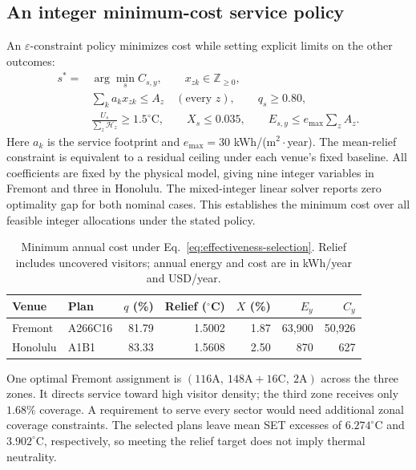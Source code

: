 \subsection{An integer minimum-cost service policy}
An $\varepsilon$-constraint policy minimizes cost while setting explicit limits on the other outcomes:
\begin{equation}
 \begin{aligned}
 s^*={}&\arg\min_s C_{s,y},\qquad x_{zk}\in\mathbb Z_{\ge0},\\
 &\sum_k a_kx_{zk}\le A_z\quad(\text{every }z),\qquad q_s\ge0.80,\\
 &\frac{U_s}{\sum_z\mathcal H_z}\ge1.5^\circ\mathrm C,\qquad
 X_s\le0.035,\qquad E_{s,y}\le e_{\max}\sum_z A_z .
 \end{aligned}
\label{eq:effectiveness-selection}
\end{equation}
Here $a_k$ is the service footprint and $e_{\max}=30$ kWh/(m$^2\!\cdot$year). The mean-relief constraint is equivalent to a residual ceiling under each venue's fixed baseline. All coefficients are fixed by the physical model, giving nine integer variables in Fremont and three in Honolulu. The mixed-integer linear solver reports zero optimality gap for both nominal cases. This establishes the minimum cost over all feasible integer allocations under the stated policy.

\begin{table}[!ht]
\centering\small
\caption{Minimum annual cost under Eq.~\eqref{eq:effectiveness-selection}. Relief includes uncovered visitors; annual energy and cost are in kWh/year and USD/year.}
\label{tab:venue-decisions}
\begin{tabular}{@{}llrrrrr@{}}
\toprule
Venue & Plan & $q$ (\%) & Relief ($^\circ$C) & $X$ (\%) & $E_y$ & $C_y$\\
\midrule
Fremont & A266C16 & 81.79 & 1.5002 & 1.87 & 63,900 & 50,926\\
Honolulu & A1B1 & 83.33 & 1.5608 & 2.50 & 870 & 627\\
\bottomrule
\end{tabular}
\end{table}

One optimal Fremont assignment is $(116\mathrm A,\ 148\mathrm A+16\mathrm C,\ 2\mathrm A)$ across the three zones. It directs service toward high visitor density; the third zone receives only $1.68\%$ coverage. A requirement to serve every sector would need additional zonal coverage constraints. The selected plans leave mean SET excesses of $6.274^\circ$C and $3.902^\circ$C, respectively, so meeting the relief target does not imply thermal neutrality.

